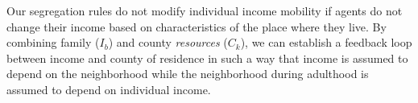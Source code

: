 \documentclass[class=article, crop=false, 12pt]{standalone}
\begin{document}
Our segregation rules do not modify individual income mobility if agents do not change their income based on characteristics of the place where they live. By combining family ($I_b$) and county \emph{resources} ($C_k$), we can establish a feedback loop between income and county of residence in such a way that income is assumed to depend on the neighborhood while the neighborhood during adulthood is assumed to depend on individual income.






\end{document}
